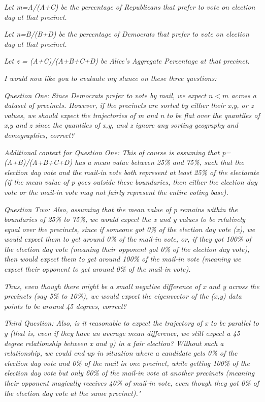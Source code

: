 \textit{Let m=A/(A+C) be the percentage of Republicans that prefer to vote on election day at that precinct.}

\textit{Let n=B/(B+D) be the percentage of Democrats that prefer to vote on election day at that precinct.}

\textit{Let z = (A+C)/(A+B+C+D) be Alice's Aggregate Percentage at that precinct.}

\textit{I would now like you to evaluate my stance on these three questions:}

\textit{Question One: Since Democrats prefer to vote by mail, we expect $n<m$ across a dataset of precincts. However, if the precincts are sorted by either their x,y, or z values, we should expect the trajectories of m and n to be flat over the quantiles of x,y and z since the quantiles of x,y, and z ignore any sorting geography and demographics, correct?}

\textit{Additional context for Question One: This of course is assuming that p=(A+B)/(A+B+C+D) has a mean value between 25\% and 75\%, such that the election day vote and the mail-in vote both represent at least 25\% of the electorate (if the mean value of p goes outside these boundaries, then either the election day vote or the mail-in vote may not fairly represent the entire voting base).}

\textit{Question Two:  Also, assuming that the mean value of p remains within the boundaries of 25\% to 75\%, we would expect the x and y values to be relatively equal over the precincts, since if someone got 0\% of the election day vote (x), we would expect them to get around 0\% of the mail-in vote, or, if they got 100\% of the election day vote (meaning their opponent got 0\% of the election day vote), then would expect them to get around 100\% of the mail-in vote (meaning we expect their opponent to get around 0\% of the mail-in vote).}

\textit{Thus, even though there might be a small negative difference of x and y across the precincts (say 5\% to 10\%), we would expect the eigenvector of the (x,y) data points to be around 45 degrees, correct?}

\textit{Third Question: Also, is it reasonable to expect the trajectory of x to be parallel to y (that is, even if they have an average mean difference, we still expect a 45 degree relationship between x and y) in a fair election? Without such a relationship, we could end up in situation where a candidate gets 0\% of the election day vote and 0\% of the mail in one precinct, while getting 100\% of the election day vote but only 60\% of the mail-in vote at another precincts (meaning their opponent magically receives 40\% of mail-in vote, even though they got 0\% of the election day vote at the same precinct)."}

